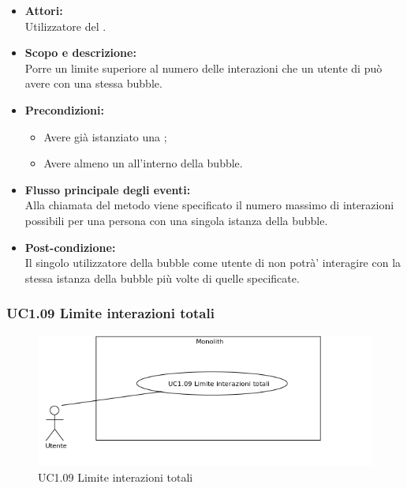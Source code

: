 \begin{itemize}
	\item \textbf{Attori:}
	\\Utilizzatore del .
	\item \textbf{Scopo e descrizione:} 
	\\Porre un limite superiore al numero delle interazioni che un utente di  può avere con una stessa bubble.
	\item \textbf{Precondizioni:}
	\begin{itemize}
		\item Avere già istanziato una ;
		\item Avere almeno un  all'interno della bubble.
	\end{itemize}
	\item \textbf{Flusso principale degli eventi:}
	\\Alla chiamata del metodo viene specificato il numero massimo di interazioni possibili per una persona con una singola istanza della bubble.
	\item \textbf{Post-condizione:}
	\\Il singolo utilizzatore della bubble come utente di  non potrà’ interagire con la stessa istanza della bubble più volte di quelle specificate.
\end{itemize}

\subsubsection{UC1.09 Limite interazioni totali} \label{UC1.09}

\begin{figure}[H]
	\centering
	\includegraphics[width=15cm]{../../documenti/AnalisiDeiRequisiti/Diagrammi_img/uc1_09.png}
	\caption{UC1.09 Limite interazioni totali}
\end{figure}

